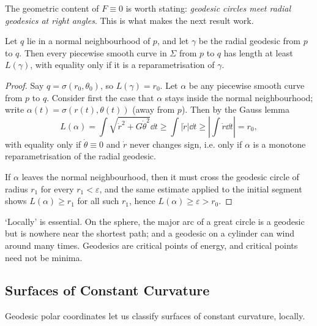 \documentclass[a4paper]{scrartcl}
\begin{document}
The geometric content of $F \equiv 0$ is worth stating: \emph{geodesic circles meet radial geodesics at right angles}. This is what makes the next result work.

\begin{proposition}
    Let $q$ lie in a normal neighbourhood of $p$, and let $\gamma$ be the radial geodesic from $p$ to $q$. Then every piecewise smooth curve in $\Sigma$ from $p$ to $q$ has length at least $L(\gamma)$, with equality only if it is a reparametrisation of $\gamma$.
\end{proposition}
\begin{proof}
    Say $q = \sigma(r_0, \theta_0)$, so $L(\gamma) = r_0$. Let $\alpha$ be any piecewise smooth curve from $p$ to $q$. Consider first the case that $\alpha$ stays inside the normal neighbourhood; write $\alpha(t) = \sigma(r(t), \theta(t))$ (away from $p$). Then by the Gauss lemma
    $$
    L(\alpha) = \int \sqrt{\dot r^2 + G\dot\theta^2}\dd t \geq \int |\dot r| \dd t \geq \left|\int \dot r \dd t\right| = r_0,
    $$
    with equality only if $\dot\theta \equiv 0$ and $\dot r$ never changes sign, i.e. only if $\alpha$ is a monotone reparametrisation of the radial geodesic.

    If $\alpha$ leaves the normal neighbourhood, then it must cross the geodesic circle of radius $r_1$ for every $r_1 < \varepsilon$, and the same estimate applied to the initial segment shows $L(\alpha) \geq r_1$ for all such $r_1$, hence $L(\alpha) \geq \varepsilon > r_0$.
\end{proof}

\begin{remark}
    `Locally' is essential. On the sphere, the major arc of a great circle is a geodesic but is nowhere near the shortest path; and a geodesic on a cylinder can wind around many times. Geodesics are critical points of energy, and critical points need not be minima.
\end{remark}

\subsection{Surfaces of Constant Curvature}

Geodesic polar coordinates let us classify surfaces of constant curvature, locally.
\end{document}
